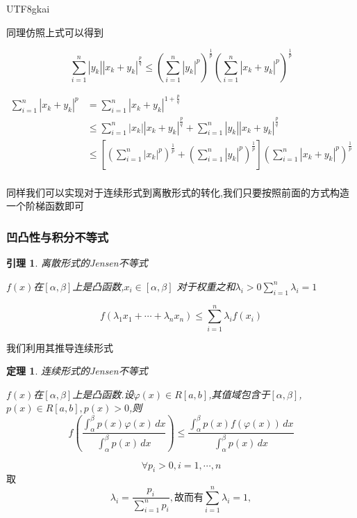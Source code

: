 \documentclass{article}
\newtheorem{theorem}{定理}[subsection]
\newtheorem{lemma}{引理}[subsection]
\newenvironment{cproof}{%
\heiti{证明}\kaishu
}{%
}
\newcommand{\parameter}[1]{\left(#1\right)}
\newcommand{\bracket}[1]{\left[#1\right]}
\newcommand{\abs}[1]{\left|#1\right|}
\begin{document}
\begin{CJK}{UTF8}{gkai}
\begin{cproof}
同理仿照上式可以得到

\[\sum_{i = 1}^{n} \abs{y_k}\abs{x_k + y_k}^{\frac{p}{q}} \leq \parameter{\sum_{i = 1}^{n} \abs{y_k}^p}^{\frac{1}{p}}
\parameter{\sum_{i = 1}^{n} \abs{x_k + y_k}^p}^{\frac{1}{p}}\]


\[
\begin{aligned}
  \sum_{i = 1}^{n}\abs{x_k + y_k}^p &= \sum_{i = 1}^{n}\abs{x_k + y_k}^{1 + \frac{p}{q}} \\
  &\leq \sum_{i = 1}^{n} \abs{x_k}\abs{x_k + y_k}^{\frac{p}{q}}+\sum_{i = 1}^{n}\abs{y_k}\abs{x_k + y_k}^{\frac{p}{q}}\\
  &\leq \bracket{\parameter{\sum_{i = 1}^{n} \abs{x_k}^p}^{\frac{1}{p}} + \parameter{\sum_{i = 1}^{n} \abs{y_k}^p}^{\frac{1}{p}}} \parameter{\sum_{i = 1}^{n} \abs{x_k + y_k}^p}^{\frac{1}{p}}\\
\end{aligned}  
  \]

\end{cproof}

同样我们可以实现对于连续形式到离散形式的转化,我们只要按照前面的方式构造一个阶梯函数即可

\subsubsection{凹凸性与积分不等式}

\begin{lemma}
  离散形式的Jensen不等式

  $f(x)$在$[\alpha,\beta]$上是凸函数,$x_i \in[\alpha,\beta]$
  对于权重之和$\lambda_i > 0 \sum_{i = 1}^{n}\lambda_i = 1$

  \[f\parameter{\lambda_1 x_1 + \cdots + \lambda_n x_n} \leq\sum_{i = 1}^{n}\lambda_i f(x_i)\]
\end{lemma}

我们利用其推导连续形式
\begin{theorem}
  连续形式的Jensen不等式

  $f(x)$在$[\alpha,\beta]$上是凸函数.设$\varphi(x) \in R[a,b]$,其值域包含于$[\alpha,\beta]$,$p(x)\in R[a,b],p(x) > 0$,则
  \[f\parameter{\dfrac{\int_{\alpha}^{\beta} p(x) \varphi(x)\,dx}{\int_{\alpha}^{\beta} p(x) \, dx}} \leq \dfrac{\int_{\alpha}^{\beta} p(x)f(\varphi(x)) \, dx }{\int_{\alpha}^{\beta}p(x) \,dx}\]
\end{theorem}
\begin{cproof}
\[\forall p_i > 0, i = 1, \cdots ,n\]
取\[\lambda_i = \dfrac{p_i}{\sum_{i =1 }^{n} p_i},\text{故而有}\sum_{i = 1}^{n}\lambda_i = 1,\]


\end{cproof}
\end{CJK}
\end{document}
